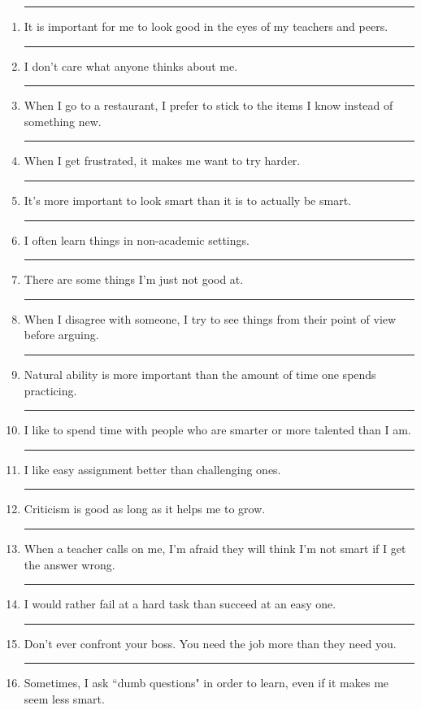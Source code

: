 \documentclass[letterpaper, 10pt]{article}
\begin{document}
\begin{enumerate}
	\item \rule{.5in}{.01in} It is important for me to look good in the eyes of my teachers and peers.
	
	\item \rule{.5in}{.01in} I don't care what anyone thinks about me.
	
	\item \rule{.5in}{.01in} When I go to a restaurant, I prefer to stick to the items I know instead of something new. 
	
	\item \rule{.5in}{.01in} When I get frustrated, it makes me want to try harder.
	
	\item \rule{.5in}{.01in} It's more important to look smart than it is to actually be smart.
	
	\item \rule{.5in}{.01in} I often learn things in non-academic settings.

	\item \rule{.5in}{.01in} There are some things I'm just not good at.
	
	\item \rule{.5in}{.01in} When I disagree with someone, I try to see things from their point of view before arguing.
	
	\item \rule{.5in}{.01in} Natural ability is more important than the amount of time one spends practicing.
	
	\item \rule{.5in}{.01in} I like to spend time with people who are smarter or more talented than I am.
	
	\item \rule{.5in}{.01in} I like easy assignment better than challenging ones.
	
		\item \rule{.5in}{.01in} Criticism is good as long as it helps me to grow.
	
	\item \rule{.5in}{.01in} When a teacher calls on me, I'm afraid they will think I'm not smart if I get the answer wrong. 	

	\item \rule{.5in}{.01in} I would rather fail at a hard task than succeed at an easy one. 
	
	\item \rule{.5in}{.01in} Don't ever confront your boss.  You need the job more than they need you.
	
	\item \rule{.5in}{.01in} Sometimes, I ask ``dumb questions" in order to learn, even if it makes me seem less smart.

	
\end{enumerate}
 
\end{document}
